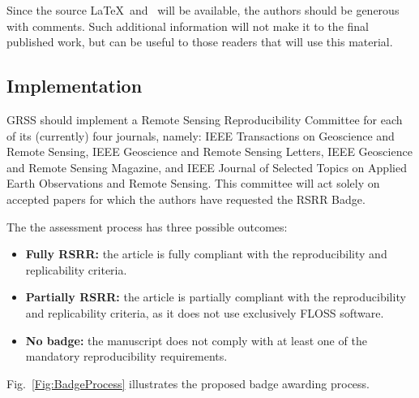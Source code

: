 \documentclass[journal,twoside]{IEEEtran}
\begin{document}
Since the source \LaTeX\ and \BibTeX\ will be available, the authors should be generous with comments.
Such additional information will not make it to the final published work, but can be useful to those readers that will use this material.


\subsection{Implementation}

GRSS should implement a Remote Sensing Reproducibility Committee for each of its (currently) four journals, namely:
IEEE Transactions on Geoscience and Remote Sensing,
IEEE Geoscience and Remote Sensing Letters,
IEEE Geoscience and Remote Sensing Magazine, and
IEEE Journal of Selected Topics on Applied Earth Observations and Remote Sensing.
This committee will act solely on accepted papers for which the authors have requested the RSRR Badge.

The the assessment process has three possible outcomes:
\begin{itemize}
	\item \textbf{Fully RSRR:} the article is fully compliant with the reproducibility and replicability criteria.
	\item \textbf{Partially RSRR:} the article is partially compliant with the reproducibility and replicability criteria, as it does not use exclusively FLOSS software.
	\item \textbf{No badge:} the manuscript does not comply with at least one of the mandatory reproducibility requirements.
\end{itemize}

Fig.~\ref{Fig:BadgeProcess} illustrates the proposed badge awarding process.
\end{document}
